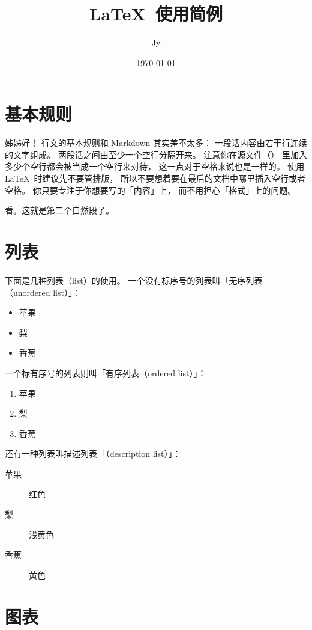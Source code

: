 \documentclass{article}
\title{\LaTeX\ 使用简例}
\author{Jy}
\date{\today}
\begin{document}
\maketitle %


\section{基本规则}

姊姊好！
行文的基本规则和 Markdown 其实差不太多：
一段话内容由若干行连续的文字组成。
两段话之间由至少一个空行分隔开来。
注意你在源文件（）
里加入多少个空行都会被当成一个空行来对待，
这一点对于空格来说也是一样的。
使用 \LaTeX\ 时建议先不要管排版，
所以不要想着要在最后的文档中哪里插入空行或者空格。
你只要专注于你想要写的「内容」上，
而不用担心「格式」上的问题。

看。这就是第二个自然段了。


\section{列表}

下面是几种列表（list）的使用。
一个没有标序号的列表叫「无序列表（unordered list）」：
\begin{itemize}
\item 
    苹果
\item 
    梨
\item 
    香蕉
\end{itemize}
一个标有序号的列表则叫「有序列表（ordered list）」：
\begin{enumerate}
\item 
    苹果
\item 
    梨
\item 
    香蕉
\end{enumerate}
还有一种列表叫描述列表「（description list）」：
\begin{description}
\item[苹果]
    红色
\item[梨]
    浅黄色
\item[香蕉]
    黄色
\end{description}

\section{图表}
\end{document}
